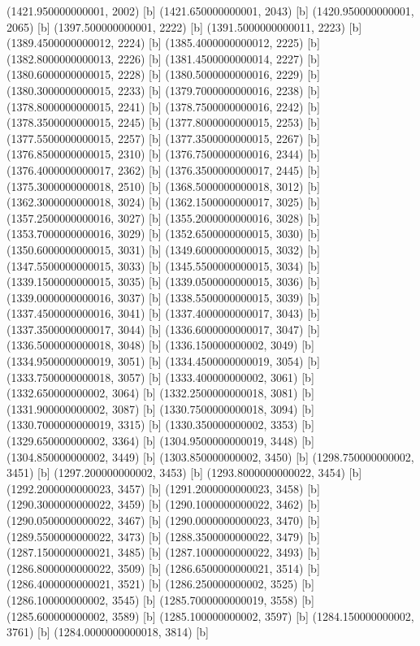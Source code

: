 {{{(1421.950000000001, 2002) [b] 
(1421.650000000001, 2043) [b] 
(1420.950000000001, 2065) [b] 
(1397.500000000001, 2222) [b] 
(1391.5000000000011, 2223) [b] 
(1389.4500000000012, 2224) [b] 
(1385.4000000000012, 2225) [b] 
(1382.8000000000013, 2226) [b] 
(1381.4500000000014, 2227) [b] 
(1380.6000000000015, 2228) [b] 
(1380.5000000000016, 2229) [b] 
(1380.3000000000015, 2233) [b] 
(1379.7000000000016, 2238) [b] 
(1378.8000000000015, 2241) [b] 
(1378.7500000000016, 2242) [b] 
(1378.3500000000015, 2245) [b] 
(1377.8000000000015, 2253) [b] 
(1377.5500000000015, 2257) [b] 
(1377.3500000000015, 2267) [b] 
(1376.8500000000015, 2310) [b] 
(1376.7500000000016, 2344) [b] 
(1376.4000000000017, 2362) [b] 
(1376.3500000000017, 2445) [b] 
(1375.3000000000018, 2510) [b] 
(1368.5000000000018, 3012) [b] 
(1362.3000000000018, 3024) [b] 
(1362.1500000000017, 3025) [b] 
(1357.2500000000016, 3027) [b] 
(1355.2000000000016, 3028) [b] 
(1353.7000000000016, 3029) [b] 
(1352.6500000000015, 3030) [b] 
(1350.6000000000015, 3031) [b] 
(1349.6000000000015, 3032) [b] 
(1347.5500000000015, 3033) [b] 
(1345.5500000000015, 3034) [b] 
(1339.1500000000015, 3035) [b] 
(1339.0500000000015, 3036) [b] 
(1339.0000000000016, 3037) [b] 
(1338.5500000000015, 3039) [b] 
(1337.4500000000016, 3041) [b] 
(1337.4000000000017, 3043) [b] 
(1337.3500000000017, 3044) [b] 
(1336.6000000000017, 3047) [b] 
(1336.5000000000018, 3048) [b] 
(1336.150000000002, 3049) [b] 
(1334.9500000000019, 3051) [b] 
(1334.4500000000019, 3054) [b] 
(1333.7500000000018, 3057) [b] 
(1333.400000000002, 3061) [b] 
(1332.650000000002, 3064) [b] 
(1332.2500000000018, 3081) [b] 
(1331.900000000002, 3087) [b] 
(1330.7500000000018, 3094) [b] 
(1330.7000000000019, 3315) [b] 
(1330.350000000002, 3353) [b] 
(1329.650000000002, 3364) [b] 
(1304.9500000000019, 3448) [b] 
(1304.850000000002, 3449) [b] 
(1303.850000000002, 3450) [b] 
(1298.750000000002, 3451) [b] 
(1297.200000000002, 3453) [b] 
(1293.8000000000022, 3454) [b] 
(1292.2000000000023, 3457) [b] 
(1291.2000000000023, 3458) [b] 
(1290.3000000000022, 3459) [b] 
(1290.1000000000022, 3462) [b] 
(1290.0500000000022, 3467) [b] 
(1290.0000000000023, 3470) [b] 
(1289.5500000000022, 3473) [b] 
(1288.3500000000022, 3479) [b] 
(1287.1500000000021, 3485) [b] 
(1287.1000000000022, 3493) [b] 
(1286.8000000000022, 3509) [b] 
(1286.6500000000021, 3514) [b] 
(1286.4000000000021, 3521) [b] 
(1286.250000000002, 3525) [b] 
(1286.100000000002, 3545) [b] 
(1285.7000000000019, 3558) [b] 
(1285.600000000002, 3589) [b] 
(1285.100000000002, 3597) [b] 
(1284.150000000002, 3761) [b] 
(1284.0000000000018, 3814) [b] 
}}}
